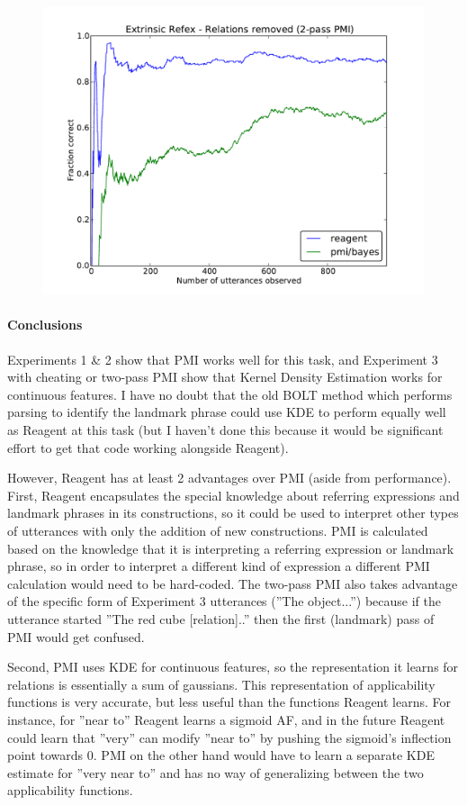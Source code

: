 \documentclass[12pt]{article}
\begin{document}
\begin{figure}[h!]
\centering
\includegraphics[scale=0.7]{grammar/5_extrinsic_refex_relations_2pass_pmi.pdf}
\caption{\label{fig:2pass}}
\end{figure}
\newpage
\paragraph{Conclusions}
Experiments 1 \& 2 show that PMI works well for this task, and Experiment 3 with cheating or two-pass PMI show that Kernel Density Estimation works for continuous features. I have no doubt that the old BOLT method which performs parsing to identify the landmark phrase could use KDE to perform equally well as Reagent at this task (but I haven't done this because it would be significant effort to get that code working alongside Reagent). 

However, Reagent has at least 2 advantages over PMI (aside from performance). First, Reagent encapsulates the special knowledge about referring expressions and landmark phrases in its constructions, so it could be used to interpret other types of utterances with only the addition of new constructions. PMI is calculated based on the knowledge that it is interpreting a referring expression or landmark phrase, so in order to interpret a different kind of expression a different PMI calculation would need to be hard-coded. The two-pass PMI also takes advantage of the specific form of Experiment 3 utterances (''The object...'') because if the utterance started ''The red cube [relation]..'' then the first (landmark) pass of PMI would get confused.

Second, PMI uses KDE for continuous features, so the representation it learns for relations is essentially a sum of gaussians. This representation of applicability functions is very accurate, but less useful than the functions Reagent learns. For instance, for ''near to'' Reagent learns a sigmoid AF, and in the future Reagent could learn that ''very'' can modify ''near to'' by pushing the sigmoid's inflection point towards 0. PMI on the other hand would have to learn a separate KDE estimate for ''very near to'' and has no way of generalizing between the two applicability functions.
\end{document}
